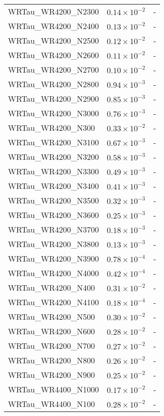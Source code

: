 \begin{longtable}[c]{| C{.35\textwidth} | C{.15\textwidth} | C{.1\textwidth}|}
    WRTau\_WR4200\_N2300 & $0.14\times10^{-2}$ & - \\
    WRTau\_WR4200\_N2400 & $0.13\times10^{-2}$ & - \\
    WRTau\_WR4200\_N2500 & $0.12\times10^{-2}$ & - \\
    WRTau\_WR4200\_N2600 & $0.11\times10^{-2}$ & - \\
    WRTau\_WR4200\_N2700 & $0.10\times10^{-2}$ & - \\
    WRTau\_WR4200\_N2800 & $0.94\times10^{-3}$ & - \\
    WRTau\_WR4200\_N2900 & $0.85\times10^{-3}$ & - \\
    WRTau\_WR4200\_N3000 & $0.76\times10^{-3}$ & - \\
    WRTau\_WR4200\_N300 & $0.33\times10^{-2}$ & - \\
    WRTau\_WR4200\_N3100 & $0.67\times10^{-3}$ & - \\
    WRTau\_WR4200\_N3200 & $0.58\times10^{-3}$ & - \\
    WRTau\_WR4200\_N3300 & $0.49\times10^{-3}$ & - \\
    WRTau\_WR4200\_N3400 & $0.41\times10^{-3}$ & - \\
    WRTau\_WR4200\_N3500 & $0.32\times10^{-3}$ & - \\
    WRTau\_WR4200\_N3600 & $0.25\times10^{-3}$ & - \\
    WRTau\_WR4200\_N3700 & $0.18\times10^{-3}$ & - \\
    WRTau\_WR4200\_N3800 & $0.13\times10^{-3}$ & - \\
    WRTau\_WR4200\_N3900 & $0.78\times10^{-4}$ & - \\
    WRTau\_WR4200\_N4000 & $0.42\times10^{-4}$ & - \\
    WRTau\_WR4200\_N400 & $0.31\times10^{-2}$ & - \\
    WRTau\_WR4200\_N4100 & $0.18\times10^{-4}$ & - \\
    WRTau\_WR4200\_N500 & $0.30\times10^{-2}$ & - \\
    WRTau\_WR4200\_N600 & $0.28\times10^{-2}$ & - \\
    WRTau\_WR4200\_N700 & $0.27\times10^{-2}$ & - \\
    WRTau\_WR4200\_N800 & $0.26\times10^{-2}$ & - \\
    WRTau\_WR4200\_N900 & $0.25\times10^{-2}$ & - \\
    WRTau\_WR4400\_N1000 & $0.17\times10^{-2}$ & - \\
    WRTau\_WR4400\_N100 & $0.28\times10^{-2}$ & - \\

\end{longtable}
